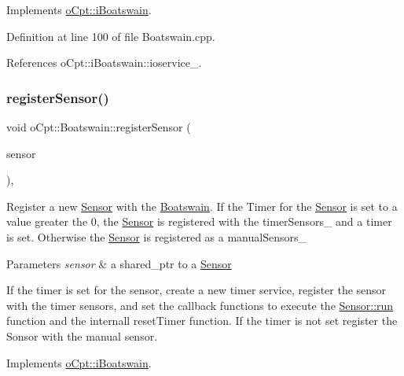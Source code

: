Implements \hyperlink{classo_cpt_1_1i_boatswain_aebae826c7516c1688e94d84de5606cac}{o\+Cpt\+::i\+Boatswain}.



Definition at line 100 of file Boatswain.\+cpp.



References o\+Cpt\+::i\+Boatswain\+::ioservice\+\_\+.

\hypertarget{classo_cpt_1_1_boatswain_ab36071db5e3f8a0db0053b5553e508f0}{}\label{classo_cpt_1_1_boatswain_ab36071db5e3f8a0db0053b5553e508f0} 
\subsubsection{\texorpdfstring{register\+Sensor()}{registerSensor()}}
{\footnotesize\ttfamily void o\+Cpt\+::\+Boatswain\+::register\+Sensor (\begin{DoxyParamCaption}\item[{\hyperlink{classo_cpt_1_1i_sensor_a03533d2c5dc66e332d70dbb3b5e3006a}{i\+Sensor\+::ptr}}]{sensor }\end{DoxyParamCaption})\hspace{0.3cm}{\ttfamily [override]}, {\ttfamily [virtual]}}

Register a new \hyperlink{classo_cpt_1_1_sensor}{Sensor} with the \hyperlink{classo_cpt_1_1_boatswain}{Boatswain}. If the Timer for the \hyperlink{classo_cpt_1_1_sensor}{Sensor} is set to a value greater the 0, the \hyperlink{classo_cpt_1_1_sensor}{Sensor} is registered with the timer\+Sensors\+\_\+ and a timer is set. Otherwise the \hyperlink{classo_cpt_1_1_sensor}{Sensor} is registered as a manual\+Sensors\+\_\+ 
\begin{DoxyParams}{Parameters}
{\em sensor} & a shared\+\_\+ptr to a \hyperlink{classo_cpt_1_1_sensor}{Sensor} \\
\hline
\end{DoxyParams}
If the timer is set for the sensor, create a new timer service, register the sensor with the timer sensors, and set the callback functions to execute the \hyperlink{classo_cpt_1_1_sensor_aef25b0e5f3a8358ee81c97c73909fbe6}{Sensor\+::run} function and the internall reset\+Timer function. If the timer is not set register the Sonsor with the manual sensor.

Implements \hyperlink{classo_cpt_1_1i_boatswain_aa9f9014202617a705d7ce21db2877222}{o\+Cpt\+::i\+Boatswain}.



